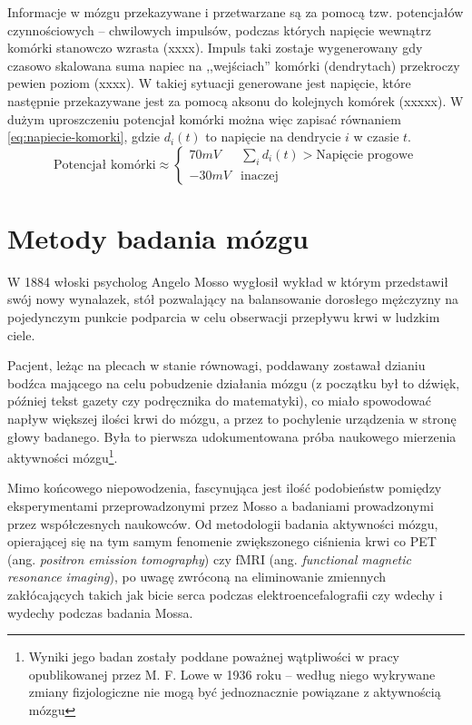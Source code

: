 \documentclass{./assets/wfis}
\begin{document}
Informacje w mózgu przekazywane i przetwarzane są za pomocą tzw. potencjałów czynnościowych – chwilowych impulsów, podczas których napięcie wewnątrz komórki stanowczo wzrasta (xxxx). Impuls taki zostaje wygenerowany gdy czasowo skalowana suma napiec na ,,wejściach'' komórki (dendrytach) przekroczy pewien poziom (xxxx). W takiej sytuacji generowane jest napięcie, które następnie przekazywane jest za pomocą aksonu do kolejnych komórek (xxxxx). W dużym uproszczeniu potencjał komórki można więc zapisać równaniem \ref{eq:napiecie-komorki}, gdzie $d_i(t)$ to napięcie na dendrycie $i$ w czasie $t$.
\begin{equation}\label{eq:napiecie-komorki}
    \text{Potencjał komórki} \approx 
    \begin{cases} 
      70mV & \sum_i d_i(t) > \text{Napięcie progowe}  \\
      -30mV &  \text{inaczej}
   \end{cases}
\end{equation}


\section{Metody badania mózgu}
W 1884 włoski psycholog Angelo Mosso wygłosił wykład \cite{sandrone_weighing_2014} w którym przedstawił swój nowy wynalazek, stół pozwalający na balansowanie dorosłego mężczyzny na pojedynczym punkcie podparcia w celu obserwacji przepływu krwi w ludzkim ciele. 

Pacjent, leżąc na plecach w stanie równowagi, poddawany zostawał dzianiu bodźca mającego na celu pobudzenie działania mózgu (z początku był to dźwięk, później tekst gazety czy podręcznika do matematyki\cite{sandrone_weighing_2014}), co miało spowodować napływ większej ilości krwi do mózgu, a przez to pochylenie urządzenia w stronę głowy badanego. Była to pierwsza udokumentowana próba naukowego mierzenia aktywności mózgu\footnote{Wyniki jego badan zostały poddane poważnej wątpliwości w pracy opublikowanej przez M. F. Lowe \cite{lowe_application_1936} w 1936 roku – według niego wykrywane zmiany fizjologiczne nie mogą być jednoznacznie powiązane z aktywnością mózgu}.

Mimo końcowego niepowodzenia, fascynująca jest ilość podobieństw pomiędzy eksperymentami przeprowadzonymi przez Mosso a badaniami prowadzonymi przez współczesnych naukowców. Od metodologii badania aktywności mózgu, opierającej się na tym samym fenomenie zwiększonego ciśnienia krwi co PET (ang. \textit{positron emission tomography}) czy fMRI (ang. \textit{functional magnetic resonance imaging}), po uwagę zwróconą na eliminowanie zmiennych zakłócających takich jak bicie serca podczas elektroencefalografii czy wdechy i wydechy podczas badania Mossa.
\end{document}
